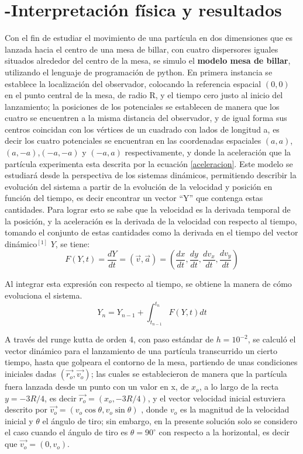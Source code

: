 \documentclass[11pt,letterpaper,twocolumn]{article}
\begin{document}
\section*{-Interpretación física y resultados}
Con el fin de estudiar el movimiento de una partícula en dos dimensiones que es lanzada hacia el centro de una mesa de billar, con cuatro dispersores iguales situados alrededor del centro de la mesa, se simulo el \textbf{modelo mesa de billar}, utilizando el lenguaje de programación de python. En primera instancia se establece la localización del observador, colocando la referencia espacial $(0,0)$ en el punto central de la mesa, de radio R, y el tiempo cero justo al inicio del lanzamiento; la posiciones de los potenciales se establecen de manera que los cuatro se encuentren a la misma distancia del observador, y de igual forma sus centros coincidan con los vértices de un cuadrado con lados de longitud a, es decir los cuatro potenciales se encuentran en las coordenadas espaciales $(a,a)$,$(a,-a)$,$(-a,-a)$ y $(-a,a)$ respectivamente, y donde la aceleración que la partícula experimenta esta descrita por la ecuación \ref{aceleracion}. Este modelo se estudiará desde la perspectiva de los sistemas dinámicos, permitiendo describir la evolución del sistema a partir de la evolución de la velocidad y posición en función del tiempo, es decir encontrar un vector “Y” que contenga estas cantidades. Para lograr esto se sabe que la velocidad es la derivada temporal de la posición, y la aceleración es la derivada de la velocidad con respecto al tiempo, tomando el conjunto de estas cantidades como la derivada en el tiempo del vector dinámico$^{[1]}$ $Y$, se tiene:\\ 
$$ F(Y,t)=\dfrac{dY}{dt}=(\vec{v},\vec{a})=( \dfrac{dx}{dt},\dfrac{dy}{dt},\dfrac{dv_{x}}{dt},\dfrac{dv_{y}}{dt}) $$
\par 
Al integrar esta expresión con respecto al tiempo, se obtiene la manera de cómo evoluciona el sistema.\\
$$ Y_{n}= Y_{n-1} + \int_{t_{n-1}}^{t_{n}} F(Y,t)dt  $$
\par 
A través del runge kutta de orden 4, con paso estándar de $h=10^{-2}$, se calculó el vector dinámico para el lanzamiento de una partícula transcurrido un cierto tiempo, hasta que golpeara el contorno de la mesa, partiendo de unas condiciones iniciales dadas $(\vec{r_{o}},\vec{v_{o}})$; las cuales se establecieron de manera que la partícula fuera lanzada desde un punto con un valor en x, de $x_{o}$, a lo largo de la recta $y=-3R/4$, es decir $\vec{r_{o}}=(x_{o},-3R/4)$, y el vector velocidad inicial estuviera descrito por $\vec{v_{o}}=(v_{o}\cos\theta,v_{o}\sin\theta)$ , donde $v_{o}$ es la magnitud de la velocidad inicial y $\theta$ el ángulo de tiro; sin embargo, en la presente solución solo se considero el caso cuando el ángulo de tiro es $\theta=90 ^{\circ}$ con respecto a la horizontal, es decir que $\vec{v_{o}}=(0,v_{o})$.\\
\end{document}
